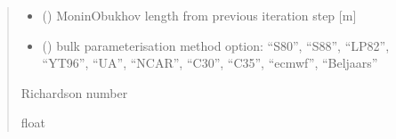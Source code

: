 \documentclass[letterpaper,10pt,english]{sphinxmanual}
\begin{document}
\begin{fulllineitems}
\begin{quote}
\begin{description}
\begin{itemize}
\item {} 
\sphinxAtStartPar
{} () \textendash{} Monin\sphinxhyphen{}Obukhov length from previous iteration step {[}m{]}

\item {} 
\sphinxAtStartPar
{} () \textendash{} bulk parameterisation method option: “S80”, “S88”, “LP82”, “YT96”,
“UA”, “NCAR”, “C30”, “C35”, “ecmwf”, “Beljaars”

\end{itemize}

\sphinxAtStartPar
{} \textendash{} Richardson number

\sphinxAtStartPar
float

\end{description}\end{quote}

\end{fulllineitems}
\end{document}
